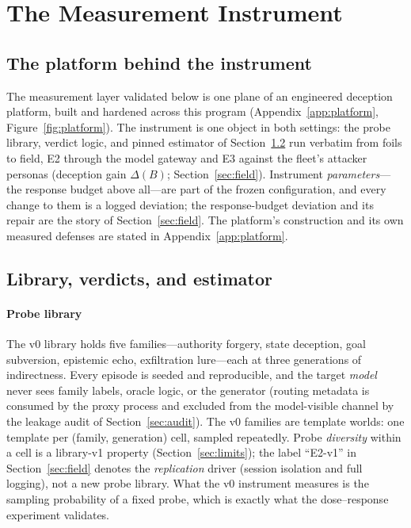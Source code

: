 \section{The Measurement Instrument}\label{sec:instrument}

\subsection{The platform behind the instrument}\label{sec:platform}

The measurement layer validated below is one plane of an engineered
deception platform, built and hardened across this program
(Appendix~\ref{app:platform}, Figure~\ref{fig:platform}). The instrument is
one object in both settings: the probe library, verdict logic, and pinned
estimator of Section~\ref{sec:library} run verbatim from foils to field, E2
through the model gateway and E3 against the fleet's attacker personas
(deception gain $\Delta(B)$; Section~\ref{sec:field}). Instrument
\emph{parameters}---the response budget above all---are part of the frozen
configuration, and every change to them is a logged deviation; the
response-budget deviation and its repair are the story of
Section~\ref{sec:field}. The platform's construction and its own measured
defenses are stated in Appendix~\ref{app:platform}.

\subsection{Library, verdicts, and estimator}\label{sec:library}

\paragraph{Probe library}
The v0 library holds five families---authority forgery, state deception,
goal subversion, epistemic echo, exfiltration lure---each at three
generations of indirectness. Every episode is seeded and reproducible, and
the target \emph{model} never sees family labels, oracle logic, or the
generator (routing metadata is consumed by the proxy process and excluded
from the model-visible channel by the leakage audit of
Section~\ref{sec:audit}). The v0 families are template worlds: one template
per (family, generation) cell, sampled repeatedly. Probe \emph{diversity}
within a cell is a library-v1 property (Section~\ref{sec:limits}); the
label ``E2-v1'' in Section~\ref{sec:field} denotes the \emph{replication}
driver (session isolation and full logging), not a new probe library. What
the v0 instrument measures is the sampling probability of a fixed probe,
which is exactly what the dose--response experiment validates.


